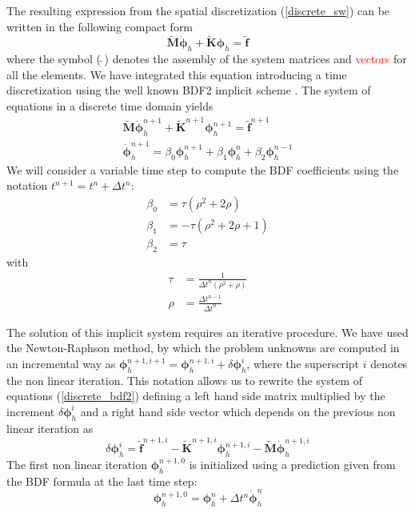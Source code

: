 \documentclass[a4paper,12pt]{elsarticle}
\newcommand{\Miguel}[1]{\textcolor{red}{#1}}
\begin{document}
The resulting expression from the spatial discretization (\ref{discrete_sw}) can be written in the following compact form 
\begin{equation} \label{discrete_compact}
\tilde{\mathbf{M}}\dot{\bm{\phi}}_h + \tilde{\mathbf{K}}\bm{\phi}_h = \tilde{\mathbf{f}}
\end{equation}
where the symbol ($\,\tilde{}\,$) denotes the assembly of the system matrices and \Miguel{vectors} for all the elements.
We have integrated this equation introducing a time discretization using the well known BDF2 implicit scheme \cite{curtiss1952,brayton1972}. The system of equations in a discrete time domain yields
\begin{equation}
\begin{split} \label{discrete_bdf2}
\tilde{\mathbf{M}}\dot{\bm{\phi}}_h^{n+1} + \tilde{\mathbf{K}}^{n+1}\bm{\phi}_h^{n+1} = \tilde{\mathbf{f}}^{n+1} \\
\dot{\bm{\phi}}_h^{n+1} = \beta_0 \bm{\phi}_h^{n+1} + \beta_1 \bm{\phi}_h^n + \beta_2 \bm{\phi}_h^{n-1}
\end{split}
\end{equation}
We will consider a variable time step to compute the BDF coefficients using the notation $t^{n+1} = t^n + \Delta t^n$:
\begin{equation}
\begin{split}
\beta_0 &= \tau (\rho^2 + 2\rho) \\
\beta_1 &= -\tau (\rho^2 + 2\rho + 1) \\
\beta_2 &= \tau
\end{split}
\end{equation}
with
\begin{equation}
\begin{split}
\tau &= \frac{1}{\Delta t^n(\rho^2 + \rho)} \\
\rho &= \frac{\Delta t^{n-1}}{\Delta t^n}
\end{split}
\end{equation}

The solution of this implicit system requires an iterative procedure. We have used the Newton-Raphson method, by which the problem unknowns are computed in an incremental way as
$\bm{\phi}_h^{n+1,i+1} = \bm{\phi}_h^{n+1,i} + \delta\bm{\phi}_h^i$,
where the superscript $i$ denotes the non linear iteration.
This notation allows us to rewrite the system of equations (\ref{discrete_bdf2}) defining a left hand side matrix multiplied by the increment $\delta\bm{\phi}_h^i$ and a right hand side vector which depends on the previous non linear iteration as
\begin{equation}
[\beta_0\tilde{\mathbf{M}} + \tilde{\mathbf{K}}^{n+1,i}] \delta\bm{\phi}_h^i
= \tilde{\mathbf{f}}^{n+1,i} - \tilde{\mathbf{K}}^{n+1,i}\bm{\phi}_h^{n+1,i} - \tilde{\mathbf{M}}\dot{\bm{\phi}}_h^{n+1,i}
\end{equation}
The first non linear iteration $\bm{\phi}_h^{n+1,0}$ is initialized using a prediction given from the BDF formula at the last time step:
\begin{equation}
\bm{\phi}_h^{n+1,0} = \bm{\phi}_h^n + \Delta t^n \dot{\bm{\phi}}_h^{n}
\end{equation}
\end{document}
